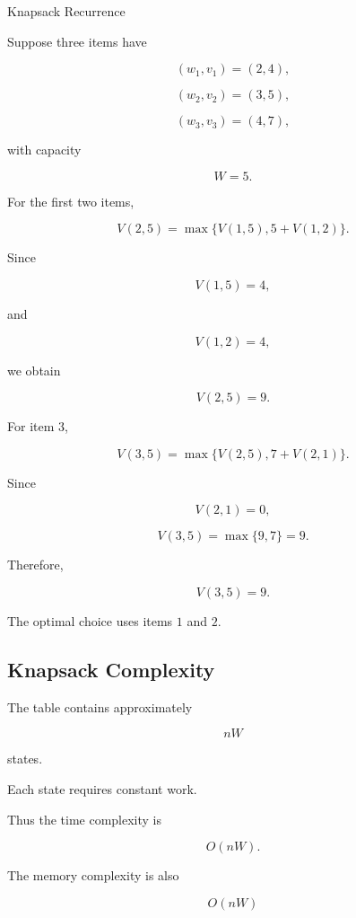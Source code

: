 \begin{workedexamplebox}{Knapsack Recurrence}

Suppose three items have

\[
(w_1,v_1)=(2,4),
\]

\[
(w_2,v_2)=(3,5),
\]

\[
(w_3,v_3)=(4,7),
\]

with capacity

\[
W=5.
\]

For the first two items,

\[
V(2,5)
=
\max
\{
V(1,5),
5+V(1,2)
\}.
\]

Since

\[
V(1,5)=4,
\]

and

\[
V(1,2)=4,
\]

we obtain

\[
V(2,5)=9.
\]

For item \(3\),

\[
V(3,5)
=
\max
\{
V(2,5),
7+V(2,1)
\}.
\]

Since

\[
V(2,1)=0,
\]

\[
V(3,5)
=
\max
\{
9,7
\}
=
9.
\]

Therefore,

\begin{answerbox}
\[
\boxed{
V(3,5)=9.
}
\]

The optimal choice uses items \(1\) and \(2\).
\end{answerbox}

\end{workedexamplebox}

\subsection{Knapsack Complexity}
\label{subsec:knapsack-dp-complexity}

The table contains approximately

\[
nW
\]

states.

Each state requires constant work.

Thus the time complexity is

\[
\boxed{
O(nW).
}
\]

The memory complexity is also

\[
\boxed{
O(nW)
}
\]

